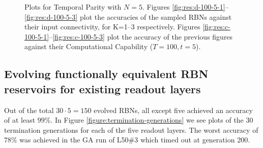 \begin{figure*}[!t]
  \centering
  \resizebox{\textwidth}{!}{
    \subfloat[K=1]{
      
      \label{fig:res:d-100-5-1}
    }
    \subfloat[K=2]{
      
      \label{fig:res:d-100-5-2}
    }
    \subfloat[K=3]{
      
      \label{fig:res:d-100-5-3}
    }
  }

  \caption{
    Plots for Temporal Parity with $N=5$.
    Figures \ref{fig:res:d-100-5-1}–\ref{fig:res:d-100-5-3} plot the accuracies of the sampled RBNs against their input connectivity,
    for K=1–3 respectively.
    Figures \ref{fig:res:c-100-5-1}–\ref{fig:res:c-100-5-3} plot the accuracy of the previous figures against their Computational Capability ($T=100, t=5$).
  }
  \label{figure:results:temporal-parity-5}
\end{figure*}

\subsection{Evolving functionally equivalent RBN reservoirs for existing readout layers}

Out of the total $30\cdot5 = 150$ evolved RBNs,
all except five achieved an accuracy of at least $99\%$.
In Figure \ref{figure:termination-generations} we see plots of the 30 termination generations for each of the five readout layers.
The worst accuracy of $78\%$  was achieved in the GA run of L50\#3 which timed out at generation 200.

